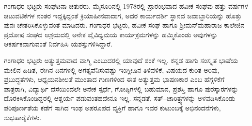 ಗಂಗಾಧರ ಭಟ್ಟರು ಸಂಘಟನಾ ಚತುರರು.  ಮೈಸೂರಿನಲ್ಲಿ 1978ರಲ್ಲಿ ಪ್ರಾರಂಭವಾದ ಹವೀಕ ಸಂಘವು ಹತ್ತು ವರ್ಷಗಳ ಚಟುವಟಿಕೆಗಳ ನಂತರ ಇದ್ದಕ್ಕಿದ್ದಂತೆ ಕ್ರಿಯಾಹೀನವಾದಾಗ, ಅದರ ಕಾರ್ಯದರ್ಶಿ ಸ್ಥಾನದ ಜವಾಬ್ದಾರಿಯನ್ನು ಹೊತ್ತು ಪುನಃ ಚೇತರಿಸಿಕೊಳ್ಳುವಂತೆ ಮಾಡಿದರು.  ಗಂಗಾಧರ ಭಟ್ಟರು, ಹವೀಕ ಸಂಘ ಹಾಗೂ  ಶ್ರೀಮನ್‍ಮಹಾರಾಜ ಕಾಲೇಜಿನ ಪ್ರದೋಷ ಸಂಘದ ಆಶ್ರಯದಲ್ಲಿ ಅನೇಕ ವೈವಿಧ್ಯಮಯ ಕಾರ್ಯಕ್ರಮಗಳನ್ನು ಹಮ್ಮಿಕೊಂಡು ಅವುಗಳನ್ನು ಆಕರ್ಷಕವಾಗುವಂತೆ ನಿರ್ವಹಿಸಿ ಯಶಸ್ಸುಗಳಿಸಿದ್ದಾರೆ.  

ಗಂಗಾಧರ ಭಟ್ಟರು ಅತ್ಯುತ್ತಮವಾದ ವಾಗ್ಮಿ ಎಂಬುದರಲ್ಲಿ ಯಾವುದೆ ಶಂಕೆ ಇಲ್ಲ.  ಕನ್ನಡ ಹಾಗು ಸಂಸ್ಕೃತ ಭಾಷೆಯ ಮೇಲಿನ ಹಿಡಿತ, ಈಗಿನ ದಿನಗಳಲ್ಲಿ ಅಗತ್ಯವೆನಿಸುವಷ್ಟು ಇಂಗ್ಲೀಷಿನ ತಿಳಿವಳಿಕೆ, ವಿಷಯದ ಕುರಿತ ಅರಿವು, ಪ್ರಬುದ್ಧತೆಗಳು,  ಆಧ್ಯಯನಶೀಲತೆ ಮುಂತಾದ ಗುಣಗಳಿಂದ ಈತ ಅತ್ಯುತ್ತಮ ಭಾಷಣಕಾರ ಎಂಬ ಹೆಗ್ಗಳಿಕೆಗೆ ಪಾತ್ರರಾಗಿ, ವಿದ್ಯಾರ್ಥಿ ದೆಸೆಯಿಂದಲೇ ಅನೇಕ ಸ್ಪರ್ಧೆ, ಗೋಷ್ಠಿಗಳಲ್ಲಿ ಬಹುಮಾನ, ಪ್ರಶಸ್ತಿ ಹಾಗೂ ಪುರಸ್ಕಾರಗಳನ್ನು ದೊರಕಿಸಿಕೊಂಡಿದ್ದರಲ್ಲಿ ಆಶ್ಚರ್ಯ ಪಡುವಂತಹದೇನೂ ಇಲ್ಲ.  ಸನ್ನಡತೆ, ಸತ್–ಚಾರಿತ್ರ್ಯಗಳನ್ನು ಅಳವಡಿಸಿಕೊಂಡು ಪರಿಪೂರ್ಣತೆಯ ಕಡೆಗೆ ಸಾಗಿದ ಇಂಥ ಅಪರೂಪದ ವ್ಯಕ್ತಿಗೆ ಹಾಗೂ ಇವರ ಕುಟುಂಬಕ್ಕೆ ಅಭಿನಂದನೆಗಳು, ಶುಭಹಾರೈಕೆಗಳು.   

\articleend

